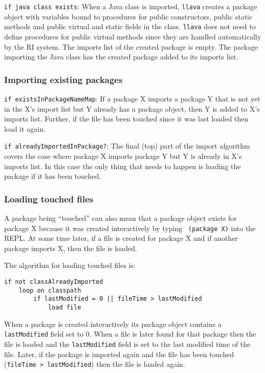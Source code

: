 \documentclass{acm_proc_article-sp}
\begin{document}
{\tt if java class exists}: When a Java class is imported, {\tt llava}
creates a package object with variables bound to procedures for public
constructors, public static methods and public virtual and static
fields in the class.  {\tt llava} does not need to define procedures
for public virtual methods since they are handled automatically by the
RI system.  The imports list of the created package is empty.  The
package importing the Java class has the created package added to its
imports list.

\subsubsection{Importing existing packages}

{\tt if existsInPackageNameMap}: If a package X imports a package Y
that is not yet in the X's import list but Y already has a package
object, then Y is added to X's imports list.  Further, if the file has
been touched since it was last loaded then load it again.

{\tt if alreadyImportedInPackage?}: The final (top) part of the import
algorithm covers the case where package X imports package Y but Y is
already in X's imports list.  In this case the only thing that needs
to happen is loading the package if it has been touched.

\subsubsection{Loading touched files}

A package being ``touched'' can also mean that a package object exists
for package X because it was created interactively by typing {\tt
(package X)} into the REPL.  At some time later, if a file is created
for package X and if another package imports X, then the file is
loaded.

The algorithm for loading touched files is:

\small
\begin{verbatim}
if not classAlreadyImported
    loop on classpath
        if lastModified = 0 || fileTime > lastModified
            load file
\end{verbatim}
\normalsize

When a package is created interactively its package object contains a
{\tt lastModified} field set to 0.  When a file is later found for
that package then the file is loaded and the {\tt lastModified} field
is set to the last modified time of the file.  Later, if the package
is imported again and the file has been touched ({\tt fileTime >
lastModified}) then the file is loaded again.
\end{document}
